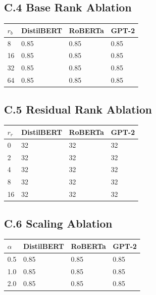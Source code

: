 \subsection{C.4 Base Rank Ablation}

\begin{table}[H]
\centering
\small
\begin{tabular}{llll}
\toprule
\textbf{$r_b$} & \textbf{DistilBERT} & \textbf{RoBERTa} & \textbf{GPT-2} \\
\midrule
8 & 0.85 & 0.85 & 0.85 \\
16 & 0.85 & 0.85 & 0.85 \\
32 & 0.85 & 0.85 & 0.85 \\
64 & 0.85 & 0.85 & 0.85 \\
\bottomrule
\end{tabular}
\end{table}

\subsection{C.5 Residual Rank Ablation}

\begin{table}[H]
\centering
\small
\begin{tabular}{llll}
\toprule
\textbf{$r_r$} & \textbf{DistilBERT} & \textbf{RoBERTa} & \textbf{GPT-2} \\
\midrule
0 & 32 & 32 & 32 \\
2 & 32 & 32 & 32 \\
4 & 32 & 32 & 32 \\
8 & 32 & 32 & 32 \\
16 & 32 & 32 & 32 \\
\bottomrule
\end{tabular}
\end{table}

\subsection{C.6 Scaling Ablation}

\begin{table}[H]
\centering
\small
\begin{tabular}{llll}
\toprule
\textbf{$\alpha$} & \textbf{DistilBERT} & \textbf{RoBERTa} & \textbf{GPT-2} \\
\midrule
0.5 & 0.85 & 0.85 & 0.85 \\
1.0 & 0.85 & 0.85 & 0.85 \\
2.0 & 0.85 & 0.85 & 0.85 \\
\bottomrule
\end{tabular}
\end{table}

